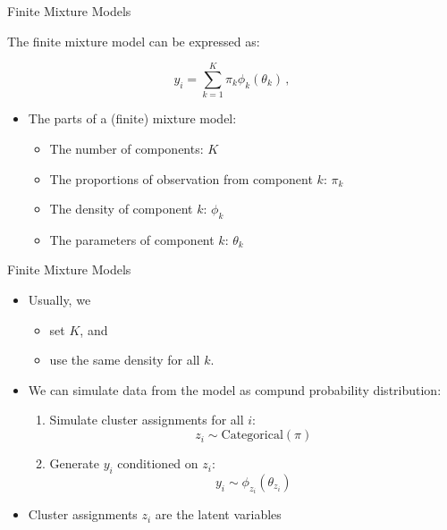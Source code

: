 \documentclass[10pt]{beamer}
\begin{document}
\begin{frame}{Finite Mixture Models}

The {\color{uured} finite mixture model} can be expressed as:

\[
y_i = \sum_{k=1}^K \pi_k \phi_k(\theta_k)\,,
\]

\begin{itemize}
\item The parts of a (finite) mixture model:
\begin{itemize}
\item The number of components: $K$\pause
\item The proportions of observation from component $k$: $\pi_k$\pause
\item The density of component $k$: $\phi_k$\pause
\item The parameters of component $k$: $\theta_k$
\end{itemize}
\end{itemize}

\end{frame}


\begin{frame}{Finite Mixture Models}

\begin{itemize}
\item Usually, we
\begin{itemize}
\item set $K$, and
\item use the same density for all $k$.
\end{itemize}
\pause
\item We can simulate data from the model as {\color{uured} compund probability distribution}:
\begin{enumerate}
\item Simulate cluster assignments for all $i$:
\[
z_i \sim \text{Categorical}(\pi)
\]
\item Generate $y_i$ conditioned on $z_i$:
\[
y_i \sim \phi_{z_i}(\theta_{z_i})
\]
\end{enumerate}
\item Cluster assignments $z_i$ are the {\color{uured} latent variables}
\end{itemize}

\end{frame}
\end{document}
